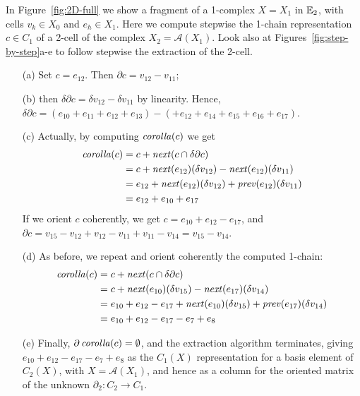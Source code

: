 \begin{example}\label{example1}

In Figure~\ref{fig:2D-full} we show a fragment of a 1-complex $X=X_1$ in $\mathbb{E}_2$, with cells $v_k\in X_0$ and $e_h\in X_1$. Here we compute stepwise the 1-chain representation $c\in C_1$ of a 2-cell of the complex $X_2 = \mathcal{A}(X_1)$. Look also at Figures~\ref{fig:step-by-step}a-e to follow stepwise the extraction of the 2-cell.
\begin{enumerate}
\item[(a)]
Set $c = e_{12}$. Then $\partial c=v_{12}-v_{11}$;
\item[(b)]
then $\delta\partial c = \delta v_{12}-\delta v_{11}$ by linearity. Hence, $\delta\partial c = (e_{10}+e_{11}+e_{12}+e_{13})-(+e_{12}+e_{14}+e_{15}+e_{16}+e_{17})$.
\item[(c)]
Actually, by computing $\mbox{\emph{corolla}}(c)$ we get
\begin{align*}
\mbox{\emph{corolla}}(c) 
&= c+\mbox{\emph{next}}(c \cap \delta \partial c)\\
&= c+\mbox{\emph{next}}(e_{12})(\delta v_{12}) - \mbox{\emph{next}}(e_{12})(\delta v_{11})\\
&= e_{12}+\mbox{\emph{next}}(e_{12})(\delta v_{12}) + \mbox{\emph{prev}}(e_{12})(\delta v_{11})\\
&= e_{12}+e_{10}+e_{17}
\end{align*}
If we orient  $c$ coherently, we get $c = e_{10}+e_{12}-e_{17}$, and $\partial c=v_{15}-v_{12}+v_{12}-v_{11}+v_{11}-v_{14} = v_{15}-v_{14}$.
\item[(d)]
As before, we repeat and orient coherently the computed 1-chain:
\begin{align*}
\mbox{\emph{corolla}}(c) 
&= c+\mbox{\emph{next}}(c \cap \delta \partial c)\\
&= c+\mbox{\emph{next}}(e_{10})(\delta v_{15}) - \mbox{\emph{next}}(e_{17})(\delta v_{14})\\
&= e_{10}+e_{12}-e_{17}+\mbox{\emph{next}}(e_{10})(\delta v_{15}) + \mbox{\emph{prev}}(e_{17})(\delta v_{14})\\
&= e_{10}+e_{12}-e_{17}-e_{7}+e_{8}
\end{align*}
\item[(e)]
Finally, $\partial\, \mbox{\emph{corolla}}(c) = \emptyset $,
and the extraction algorithm terminates, giving 
$e_{10}+e_{12}-e_{17}-e_{7}+e_{8}$ as the $C_1(X)$ representation for a basis element of $C_2(X)$, with $X = \mathcal{A}(X_1)$,  and hence as a column for the oriented matrix of the unknown $\partial_2: C_2\to C_1$. 
\end{enumerate}

\end{example}



